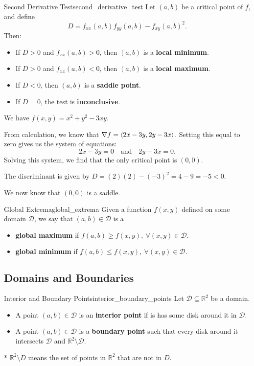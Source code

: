 \begin{definition}{Second Derivative Test}{second_derivative_test}
Let $(a,b)$ be a critical point of $f$, and define
\[
D=f_{xx}(a, b)f_{yy}(a, b)-f_{xy}(a, b)^2.
\]
Then:
\begin{itemize}
    \item If $D > 0$ and $f_{xx}(a, b)>0$, then $(a, b)$ is a \textbf{local minimum}.
    \item If $D > 0$ and $f_{xx}(a, b)<0$, then $(a, b)$ is a \textbf{local maximum}.
    \item If $D < 0$, then $(a, b)$ is a \textbf{saddle point}.
    \item If $D = 0$, the test is \textbf{inconclusive}.
\end{itemize}
\end{definition}

\begin{example}
We have $f(x, y) = x^2 + y^2 - 3xy$. 

From calculation, we know that $\nabla f = \left\langle 2x - 3y, 2y - 3x \right\rangle$.
Setting this equal to zero gives us the system of equations:
\[
2x - 3y = 0 \quad \text{and} \quad 2y - 3x = 0.
\]
Solving this system, we find that the only critical point is $(0, 0)$.

The discriminant is given by $D = (2)(2) - (-3)^2 = 4 - 9 = -5 < 0$.

We now know that $(0, 0)$ is a saddle.
\end{example}

\begin{definition}{Global Extrema}{global_extrema}
Given a function $f(x, y)$ defined on some domain $\mathcal{D}$, we say that $(a, b) \in \mathcal{D}$ is a
\begin{itemize}
    \item \textbf{global maximum} if $f(a, b) \geq f(x, y),\ \forall (x, y) \in \mathcal{D}$.
    \item \textbf{global minimum} if $f(a, b) \leq f(x, y),\ \forall (x, y) \in \mathcal{D}$.
\end{itemize}
\end{definition}

\subsection{Domains and Boundaries}


\begin{definition}{Interior and Boundary Points}{interior_boundary_points}
Let $\mathcal{D} \subseteq \mathbb{R}^2$ be a domain.
\begin{itemize}
    \item A point $(a, b) \in \mathcal{D}$ is an \textbf{interior point} if is has some disk around it in $\mathcal{D}$.
    \item A point $(a, b) \in \mathcal{D}$ is a \textbf{boundary point} such that every disk around it intersects $\mathcal{D}$ and $\mathbb{R}^2 \setminus \mathcal{D}$.
\end{itemize}
* $\mathbb{R}^2 \setminus D$ means the set of points in $\mathbb{R}^2$ that are not in $D$.
\end{definition}

